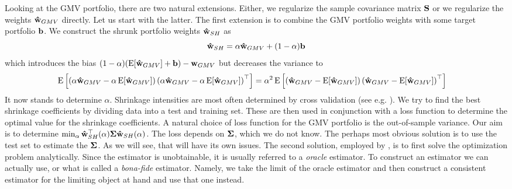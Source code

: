 \documentclass[oneside]{book}\usepackage{knitr}
\begin{document}
Looking at the GMV portfolio, there are two natural extensions. 
Either, we regularize the sample covariance matrix $\mathbf{S}$ or we regularize the weights $\mathbf{\hat{w}}_{GMV}$ directly. 
Let us start with the latter. 
The first extension is to combine the GMV portfolio weights with some target portfolio $\mathbf{b}$. 
We construct the shrunk portfolio weights $\mathbf{\hat{w}}_{SH}$ as
\begin{equation}
  \mathbf{\hat{w}}_{SH} = \alpha\mathbf{\hat{w}}_{GMV} + (1-\alpha)\mathbf{b}
\end{equation}
which introduces the bias $(1-\alpha)(\operatorname{E}[\mathbf{\hat{w}}_{GMV}]+\mathbf{b}) - \mathbf{w}_{GMV}$ but decreases the variance to
\begin{align}
  \operatorname{E}\left[\left(\alpha\mathbf{\hat{w}}_{GMV} - \alpha \operatorname{E}[\mathbf{\hat{w}}_{GMV}]\right)\left(\alpha\mathbf{\hat{w}}_{GMV} - \alpha \operatorname{E}[\mathbf{\hat{w}}_{GMV}]\right)^\top\right] 
  & = 
  \alpha^2\operatorname{E}\left[\left(\mathbf{\hat{w}}_{GMV} - \operatorname{E}[\mathbf{\hat{w}}_{GMV}]\right)\left(\mathbf{\hat{w}}_{GMV} - \operatorname{E}[\mathbf{\hat{w}}_{GMV}]\right)^\top\right]
\end{align}
It now stands to determine $\alpha$. 
Shrinkage intensities are most often determined by cross validation (see e.g. \citet[ch. 5]{james2013introduction}). 
We try to find the best shrinkage coefficients by dividing data into a test and training set.
These are then used in conjunction with a loss function to determine the optimal value for the shrinkage coefficients.
A natural choice of loss function for the GMV portfolio is the out-of-sample variance.
Our aim is to determine $\min_\alpha \mathbf{\hat{w}}_{SH}^\top(\alpha) \mathbf{\Sigma} \mathbf{\hat{w}}_{SH}(\alpha)$.
The loss depends on $\mathbf{\Sigma}$, which we do not know.
The perhaps most obvious solution is to use the test set to estimate the $\mathbf{\Sigma}$. 
As we will see, that will have its own issues.
The second solution, employed by \citet{bodnar2018estimation}, is to first solve the optimization problem analytically.
Since the estimator is unobtainable, it is usually referred to a \textit{oracle} estimator. 
To construct an estimator we can actually use, or what is called a \textit{bona-fide} estimator. 
Namely, we take the limit of the oracle estimator and then construct a consistent estimator for the limiting object at hand and use that one instead.
\end{document}
